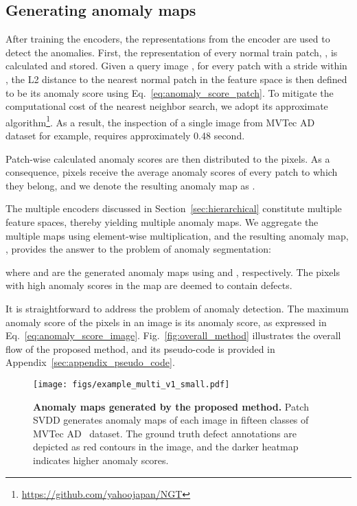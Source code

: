 \documentclass[runningheads]{llncs}
\begin{document}
\subsection{Generating anomaly maps}
After training the encoders, the representations from the encoder are used to detect the anomalies.
First, the representation of every normal train patch, , is calculated and stored.
Given a query image , for every patch  with a stride  within , the L2 distance to the nearest normal patch in the feature space is then defined to be its anomaly score using Eq.~\ref{eq:anomaly_score_patch}.
To mitigate the computational cost of the nearest neighbor search, we adopt its approximate algorithm\footnote{\url{https://github.com/yahoojapan/NGT}}.
As a result, the inspection of a single image from MVTec AD~\cite{mvtecad} dataset for example, requires approximately 0.48 second.



Patch-wise calculated anomaly scores are then distributed to the pixels.
As a consequence, pixels receive the average anomaly scores of every patch to which they belong, and we denote the resulting anomaly map as .

The multiple encoders discussed in Section~\ref{sec:hierarchical} constitute multiple feature spaces, thereby yielding multiple anomaly maps.
We aggregate the multiple maps using element-wise multiplication, and the resulting anomaly map, , provides the answer to the problem of anomaly segmentation:


where  and  are the generated anomaly maps using  and , respectively.
The pixels with high anomaly scores in the map  are deemed to contain defects.

It is straightforward to address the problem of anomaly detection.
The maximum anomaly score of the pixels in an image is its anomaly score, as expressed in Eq.~\ref{eq:anomaly_score_image}.
Fig.~\ref{fig:overall_method} illustrates the overall flow of the proposed method, and its pseudo-code is provided in Appendix~\ref{sec:appendix_pseudo_code}.


 
\begin{figure}[t]
    \centering
    \texttt{[image: figs/example\_multi\_v1\_small.pdf]}
    \vspace{-10pt}
    \caption{\textbf{Anomaly maps generated by the proposed method.} Patch SVDD generates anomaly maps of each image in fifteen classes of MVTec AD~\cite{mvtecad} dataset. The ground truth defect annotations are depicted as red contours in the image, and the darker heatmap indicates higher anomaly scores.
    }
    \label{fig:anomaly_maps}
    \vspace{-5pt}
\end{figure}
 
\end{document}
